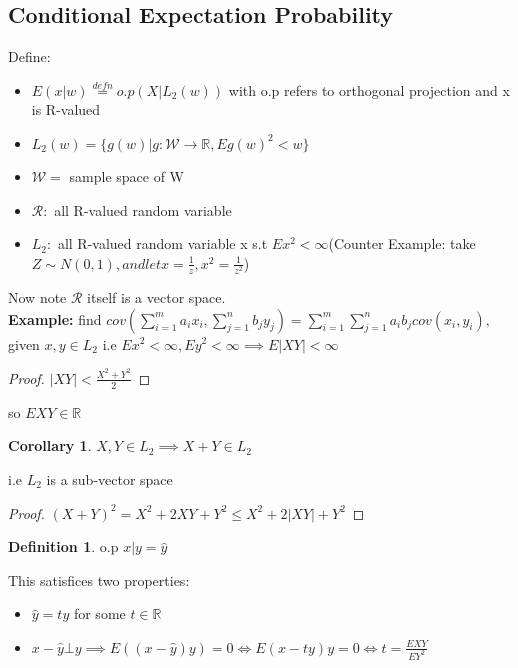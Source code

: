\documentclass{article}
\theoremstyle{definition}
\newtheorem{definition}{Definition}[section]
\theoremstyle{thrm}
\theoremstyle{lma}
\theoremstyle{ppst}
\theoremstyle{crlr}
\newtheorem{crlr}{Corollary}[section]
\begin{document}
\subsection{Conditional Expectation Probability}
Define:
\begin{itemize}
	\item $E(x|w)\stackrel{defn}{=} o.p(X|L_2(w))$ with o.p refers to orthogonal projection and x is R-valued
	\item $L_2(w) = \{g(w)|g: \mathcal{W}\to\mathbb{R}, Eg(w)^2<w\}$
	\item $\mathcal{W} = $ sample space of W
	\item $\mathcal{R}:$ all R-valued random variable
	\item $L_2: $ all R-valued random variable x s.t $Ex^2 < \infty$(Counter Example: take $Z \sim N(0,1), and let x = \frac{1}{z}, x^2 = \frac{1}{z^2}$)
\end{itemize}
Now note $\mathcal{R}$ itself is a vector space. \\
\textbf{Example:} find $cov(\sum_{i=1}^ma_ix_i, \sum_{j=1}^nb_jy_j) = \sum_{i=1}^m\sum_{j=1}^na_ib_j cov(x_i,y_i),$ given $x,y\in L_2$ i.e $Ex^2<\infty, Ey^2<\infty \implies E|XY| <\infty$
\begin{proof}
	$|XY|<\frac{X^2+Y^2}{2}$
\end{proof}
so $EXY\in \mathbb{R}$
\begin{crlr}
	$X,Y\in L_2 \implies X+Y \in L_2$
\end{crlr}
i.e $L_2$ is a sub-vector space
\begin{proof}
	$(X+Y)^2 = X^2+2XY+Y^2\leq X^2+2|XY|+Y^2$ 
\end{proof}
{
\center
{}
}
\begin{definition}
	o.p $x|y = \hat{y}$
\end{definition}
This satisfices two properties:
\begin{itemize}
	\item $\hat{y} = ty$ for some $t \in \mathbb{R}$
	\item $x-\hat{y} \bot y \implies E((x-\hat{y})y)=0 \iff E(x-ty)y=0 \iff t = \frac{EXY}{EY^2}$
\end{itemize}
\end{document}
